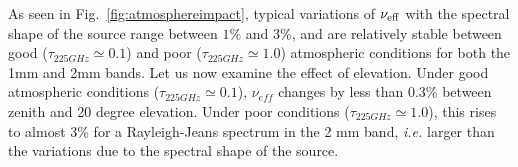 


As seen in Fig.~\ref{fig:atmosphereimpact}, typical variations of $\nu_{\rm{eff}}$ with the spectral shape of the
source range between $1\%$ and $3\%$, and are relatively stable
between good ($\tau_{225GHz} \simeq 0.1$) and
poor  ($\tau_{225GHz} \simeq 1.0$) atmospheric conditions for both the
1mm and 2mm bands. Let us now examine the effect of elevation.
Under good atmospheric conditions ($\tau_{225GHz} \simeq 0.1$), $\nu_{eff}$ changes by
less than 0.3\% between zenith and 20 degree elevation. Under poor
conditions ($\tau_{225GHz} \simeq 1.0$), this rises to almost 3\% for
a Rayleigh-Jeans spectrum in the 2 mm band, {\it i.e.} larger than the
variations due to the spectral shape of the source.


